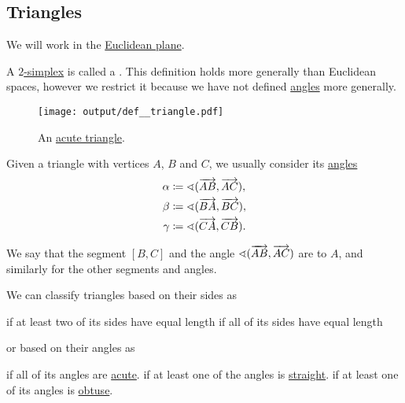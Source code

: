 \subsection{Triangles}\label{subsec:triangles}

We will work in the \hyperref[def:euclidean_plane]{Euclidean plane}.

\begin{definition}\label{def:triangle}
  A \hyperref[def:simplex]{\( 2 \)-simplex} is called a . This definition holds more generally than Euclidean spaces, however we restrict it because we have not defined \hyperref[def:angle]{angles} more generally.

  \begin{figure}[!ht]
    \centering
    \texttt{[image: output/def\_\_triangle.pdf]}
    \caption{An \hyperref[def:triangle/measure/acute]{acute triangle}.}\label{fig:def:triangle}
  \end{figure}

  Given a triangle with vertices \( A \), \( B \) and \( C \), we usually consider its \hyperref[def:angle]{ angles}
  \begin{align*}
    \alpha &\coloneqq \sphericalangle(\overrightarrow{AB}, \overrightarrow{AC}), \\
    \beta  &\coloneqq \sphericalangle(\overrightarrow{BA}, \overrightarrow{BC}), \\
    \gamma &\coloneqq \sphericalangle(\overrightarrow{CA}, \overrightarrow{CB}).
  \end{align*}

  We say that the segment \( [B, C] \) and the angle \( \sphericalangle(\overrightarrow{AB}, \overrightarrow{AC}) \) are  to \( A \), and similarly for the other segments and angles.

  We can classify triangles based on their sides as
  \begin{thmenum}
      if at least two of its sides have equal length
      if all of its sides have equal length
  \end{thmenum}
  or based on their angles as
  \begin{thmenum}
      if all of its angles are \hyperref[def:angle/measure/acute]{acute}.
      if at least one of the angles is \hyperref[def:angle/measure/straight]{straight}.
      if at least one of its angles is \hyperref[def:angle/measure/obtuse]{obtuse}.
  \end{thmenum}
\end{definition}

